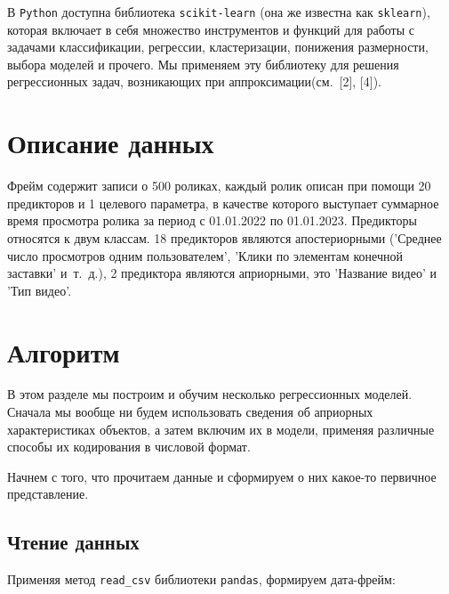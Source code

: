 \documentclass[a4paper,12pt]{article}
\begin{document}
В \texttt{Python} доступна библиотека \texttt{scikit-learn} (она же известна как \texttt{sklearn}), которая включает в себя множество инструментов и функций для работы с задачами классификации, регрессии, кластеризации, понижения размерности, выбора моделей и прочего. Мы применяем эту библиотеку для решения регрессионных задач, возникающих при аппроксимации(см. [2], [4]).

\section{Описание данных}
Фрейм содержит записи о 500 роликах, каждый ролик описан при помощи 20 предикторов и 1 целевого параметра, в качестве которого выступает суммарное время просмотра ролика за период с 01.01.2022 по 01.01.2023. Предикторы относятся к двум классам. 18 предикторов являются апостериорными ('Среднее число просмотров одним пользователем', 'Клики по элементам конечной заставки' и т. д.), 2 предиктора являются априорными, это 'Название видео' и 'Тип видео'.


\section{Алгоритм}
В этом разделе  мы построим и обучим несколько регрессионных моделей. Сначала мы вообще ни будем использовать сведения об априорных характеристиках объектов, а затем включим их в модели, применяя различные способы их кодирования в числовой формат.

Начнем с того, что прочитаем данные и сформируем о них какое-то первичное представление.
\subsection{Чтение данных}
Применяя метод \texttt{read\_csv} библиотеки \texttt{pandas}, формируем дата-фрейм:
\end{document}
